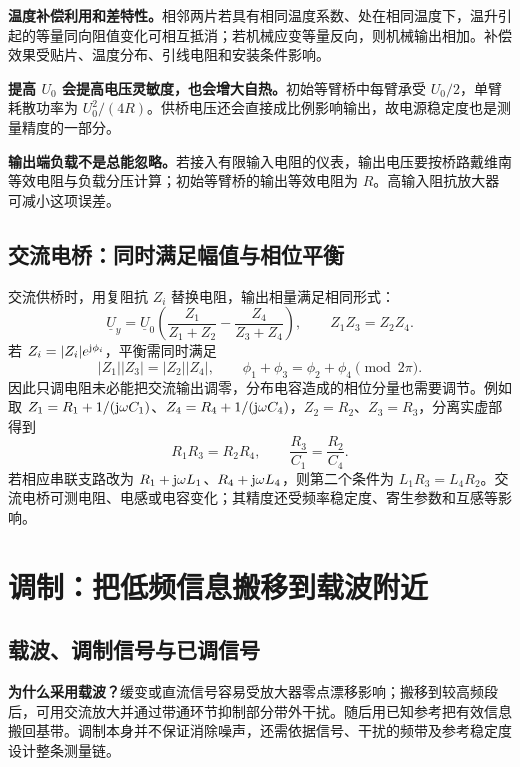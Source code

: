 \textbf{温度补偿利用和差特性。}相邻两片若具有相同温度系数、处在相同温度下，温升引起的等量同向阻值变化可相互抵消；若机械应变等量反向，则机械输出相加。补偿效果受贴片、温度分布、引线电阻和安装条件影响。

\textbf{提高 $U_0$ 会提高电压灵敏度，也会增大自热。}初始等臂桥中每臂承受 $U_0/2$，单臂耗散功率为 $U_0^2/(4R)$。供桥电压还会直接成比例影响输出，故电源稳定度也是测量精度的一部分。

\textbf{输出端负载不是总能忽略。}若接入有限输入电阻的仪表，输出电压要按桥路戴维南等效电阻与负载分压计算；初始等臂桥的输出等效电阻为 $R$。高输入阻抗放大器可减小这项误差。

\subsection{交流电桥：同时满足幅值与相位平衡}

交流供桥时，用复阻抗 $Z_i$ 替换电阻，输出相量满足相同形式：
\[
\underline U_y=\underline U_0\left(\frac{Z_1}{Z_1+Z_2}-\frac{Z_4}{Z_3+Z_4}\right),
\qquad \boxed{Z_1Z_3=Z_2Z_4}.
\]
若 $Z_i=|Z_i|e^{\mathrm{j}\phi_i}$，平衡需同时满足
\[
|Z_1||Z_3|=|Z_2||Z_4|,\qquad
\phi_1+\phi_3=\phi_2+\phi_4\pmod{2\pi}.
\]
因此只调电阻未必能把交流输出调零，分布电容造成的相位分量也需要调节。例如取 $Z_1=R_1+1/(\mathrm{j}\omega C_1)$、$Z_4=R_4+1/(\mathrm{j}\omega C_4)$，$Z_2=R_2$、$Z_3=R_3$，分离实虚部得到
\[
R_1R_3=R_2R_4,\qquad \frac{R_3}{C_1}=\frac{R_2}{C_4}.
\]
若相应串联支路改为 $R_1+\mathrm{j}\omega L_1$、$R_4+\mathrm{j}\omega L_4$，则第二个条件为 $L_1R_3=L_4R_2$。交流电桥可测电阻、电感或电容变化；其精度还受频率稳定度、寄生参数和互感等影响。

\clearpage
\section{调制：把低频信息搬移到载波附近}
\label{sec:ch5-modulation}

\subsection{载波、调制信号与已调信号}
\noindent{}


\textbf{为什么采用载波？}缓变或直流信号容易受放大器零点漂移影响；搬移到较高频段后，可用交流放大并通过带通环节抑制部分带外干扰。随后用已知参考把有效信息搬回基带。调制本身并不保证消除噪声，还需依据信号、干扰的频带及参考稳定度设计整条测量链。

